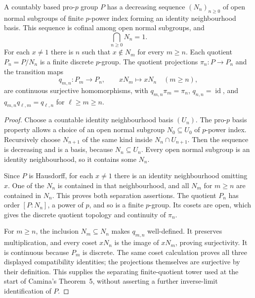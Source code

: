 \begin{lemma}
\label{lem:pro-p-countable-quotient-tower}
\leanok
A countably based pro-$p$ group $P$ has a decreasing sequence
$(N_n)_{n\ge0}$ of open normal subgroups of finite $p$-power index
forming an identity neighbourhood basis. This sequence is cofinal
among open normal subgroups, and
\[
 \bigcap_{n\ge0}N_n=1.
\]
For each $x\ne1$ there is $n$ such that $x\notin N_m$ for every
$m\ge n$. Each quotient $P_n=P/N_n$ is a finite discrete $p$-group.
The quotient projections $\pi_n:P\to P_n$ and the transition maps
\[
 q_{m,n}:P_m\longrightarrow P_n,\qquad xN_m\longmapsto xN_n
 \quad(m\ge n),
\]
are continuous surjective homomorphisms, with
$q_{m,n}\pi_m=\pi_n$, $q_{n,n}=\operatorname{id}$, and
$q_{m,n}q_{\ell,m}=q_{\ell,n}$ for $\ell\ge m\ge n$.
\end{lemma}

\begin{proof}
Choose a countable identity neighbourhood basis $(U_n)$.
The pro-$p$ basis property allows a choice of an open normal
subgroup $N_0\subseteq U_0$ of $p$-power index. Recursively choose
$N_{n+1}$ of the same kind inside $N_n\cap U_{n+1}$.
Then the sequence is decreasing and is a basis, because
$N_n\subseteq U_n$. Every open normal subgroup is an identity
neighbourhood, so it contains some $N_n$.

Since $P$ is Hausdorff, for each $x\ne1$ there is an identity
neighbourhood omitting $x$. One of the $N_n$ is contained in
that neighbourhood, and all $N_m$ for $m\ge n$ are contained
in $N_n$. This proves both separation assertions.
The quotient $P_n$ has order $[P:N_n]$, a power of $p$,
and so is a finite $p$-group. Its cosets are open, which gives
the discrete quotient topology and continuity of $\pi_n$.

For $m\ge n$, the inclusion $N_m\subseteq N_n$ makes
$q_{m,n}$ well-defined. It preserves multiplication, and every
coset $xN_n$ is the image of $xN_m$, proving surjectivity.
It is continuous because $P_m$ is discrete. The same coset
calculation proves all three displayed compatibility identities;
the projections themselves are surjective by their definition.
This supplies the separating finite-quotient tower used at the
start of Camina's Theorem~5, without asserting a further
inverse-limit identification of $P$.
\end{proof}

